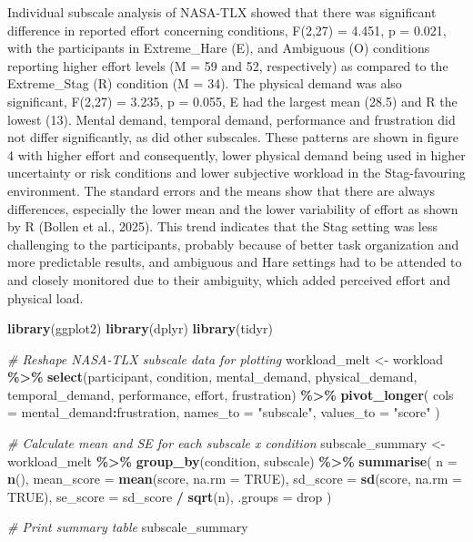 \documentclass[
]{article}
\newenvironment{Shaded}{\begin{snugshade}}{\end{snugshade}}
\newcommand{\AttributeTok}[1]{\textcolor[rgb]{0.13,0.29,0.53}{#1}}
\newcommand{\CommentTok}[1]{\textcolor[rgb]{0.56,0.35,0.01}{\textit{#1}}}
\newcommand{\ConstantTok}[1]{\textcolor[rgb]{0.56,0.35,0.01}{#1}}
\newcommand{\FunctionTok}[1]{\textcolor[rgb]{0.13,0.29,0.53}{\textbf{#1}}}
\newcommand{\NormalTok}[1]{#1}
\newcommand{\OtherTok}[1]{\textcolor[rgb]{0.56,0.35,0.01}{#1}}
\newcommand{\SpecialCharTok}[1]{\textcolor[rgb]{0.81,0.36,0.00}{\textbf{#1}}}
\newcommand{\StringTok}[1]{\textcolor[rgb]{0.31,0.60,0.02}{#1}}
\begin{document}
Individual subscale analysis of NASA-TLX showed that there was
significant difference in reported effort concerning conditions, F(2,27)
= 4.451, p = 0.021, with the participants in Extreme\_Hare (E), and
Ambiguous (O) conditions reporting higher effort levels (M = 59 and 52,
respectively) as compared to the Extreme\_Stag (R) condition (M = 34).
The physical demand was also significant, F(2,27) = 3.235, p = 0.055, E
had the largest mean (28.5) and R the lowest (13). Mental demand,
temporal demand, performance and frustration did not differ
significantly, as did other subscales. These patterns are shown in
figure 4 with higher effort and consequently, lower physical demand
being used in higher uncertainty or risk conditions and lower subjective
workload in the Stag-favouring environment. The standard errors and the
means show that there are always differences, especially the lower mean
and the lower variability of effort as shown by R (Bollen et al., 2025).
This trend indicates that the Stag setting was less challenging to the
participants, probably because of better task organization and more
predictable results, and ambiguous and Hare settings had to be attended
to and closely monitored due to their ambiguity, which added perceived
effort and physical load.

\begin{Shaded}
\begin{Highlighting}[]
\FunctionTok{library}\NormalTok{(ggplot2)}
\FunctionTok{library}\NormalTok{(dplyr)}
\FunctionTok{library}\NormalTok{(tidyr)}

\CommentTok{\# Reshape NASA{-}TLX subscale data for plotting}
\NormalTok{workload\_melt }\OtherTok{\textless{}{-}}\NormalTok{ workload }\SpecialCharTok{\%\textgreater{}\%}
  \FunctionTok{select}\NormalTok{(participant, condition, mental\_demand, physical\_demand, }
\NormalTok{         temporal\_demand, performance, effort, frustration) }\SpecialCharTok{\%\textgreater{}\%}
  \FunctionTok{pivot\_longer}\NormalTok{(}
    \AttributeTok{cols =}\NormalTok{ mental\_demand}\SpecialCharTok{:}\NormalTok{frustration,}
    \AttributeTok{names\_to =} \StringTok{"subscale"}\NormalTok{,}
    \AttributeTok{values\_to =} \StringTok{"score"}
\NormalTok{  )}

\CommentTok{\# Calculate mean and SE for each subscale x condition}
\NormalTok{subscale\_summary }\OtherTok{\textless{}{-}}\NormalTok{ workload\_melt }\SpecialCharTok{\%\textgreater{}\%}
  \FunctionTok{group\_by}\NormalTok{(condition, subscale) }\SpecialCharTok{\%\textgreater{}\%}
  \FunctionTok{summarise}\NormalTok{(}
    \AttributeTok{n =} \FunctionTok{n}\NormalTok{(),}
    \AttributeTok{mean\_score =} \FunctionTok{mean}\NormalTok{(score, }\AttributeTok{na.rm =} \ConstantTok{TRUE}\NormalTok{),}
    \AttributeTok{sd\_score =} \FunctionTok{sd}\NormalTok{(score, }\AttributeTok{na.rm =} \ConstantTok{TRUE}\NormalTok{),}
    \AttributeTok{se\_score =}\NormalTok{ sd\_score }\SpecialCharTok{/} \FunctionTok{sqrt}\NormalTok{(n),}
    \AttributeTok{.groups =} \StringTok{\textquotesingle{}drop\textquotesingle{}}
\NormalTok{  )}

\CommentTok{\# Print summary table}
\NormalTok{subscale\_summary}
\end{Highlighting}
\end{Shaded}
\end{document}

